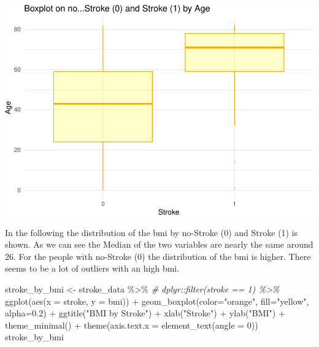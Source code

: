 \documentclass[
]{article}
\newenvironment{Shaded}{\begin{snugshade}}{\end{snugshade}}
\newcommand{\AttributeTok}[1]{\textcolor[rgb]{0.77,0.63,0.00}{#1}}
\newcommand{\CommentTok}[1]{\textcolor[rgb]{0.56,0.35,0.01}{\textit{#1}}}
\newcommand{\DecValTok}[1]{\textcolor[rgb]{0.00,0.00,0.81}{#1}}
\newcommand{\FloatTok}[1]{\textcolor[rgb]{0.00,0.00,0.81}{#1}}
\newcommand{\FunctionTok}[1]{\textcolor[rgb]{0.00,0.00,0.00}{#1}}
\newcommand{\NormalTok}[1]{#1}
\newcommand{\OtherTok}[1]{\textcolor[rgb]{0.56,0.35,0.01}{#1}}
\newcommand{\SpecialCharTok}[1]{\textcolor[rgb]{0.00,0.00,0.00}{#1}}
\newcommand{\StringTok}[1]{\textcolor[rgb]{0.31,0.60,0.02}{#1}}
\renewcommand{\=}[1]{\stackrel{#1}{=}}
\theoremstyle{definition}
\theoremstyle{remark}
\begin{document}
\includegraphics{sioux_mach_learn_project_files/figure-latex/unnamed-chunk-17-1.pdf}

In the following the distribution of the bmi by no-Stroke (0) and Stroke (1) is shown. As we can see the Median of the two variables are nearly the same around 26. For the people with no-Stroke (0) the distribution of the bmi is higher. There seems to be a lot of outliers with an high bmi.

\begin{Shaded}
\begin{Highlighting}[]
\NormalTok{stroke\_by\_bmi }\OtherTok{\textless{}{-}}\NormalTok{ stroke\_data }\SpecialCharTok{\%\textgreater{}\%}
\CommentTok{\# dplyr::filter(stroke == 1) \%\textgreater{}\%}
 \FunctionTok{ggplot}\NormalTok{(}\FunctionTok{aes}\NormalTok{(}\AttributeTok{x =}\NormalTok{ stroke,}
            \AttributeTok{y =}\NormalTok{ bmi)) }\SpecialCharTok{+}
  \FunctionTok{geom\_boxplot}\NormalTok{(}\AttributeTok{color=}\StringTok{"orange"}\NormalTok{, }\AttributeTok{fill=}\StringTok{"yellow"}\NormalTok{, }\AttributeTok{alpha=}\FloatTok{0.2}\NormalTok{) }\SpecialCharTok{+}
  \FunctionTok{ggtitle}\NormalTok{(}\StringTok{"BMI by Stroke"}\NormalTok{) }\SpecialCharTok{+} 
  \FunctionTok{xlab}\NormalTok{(}\StringTok{"Stroke"}\NormalTok{) }\SpecialCharTok{+} \FunctionTok{ylab}\NormalTok{(}\StringTok{"BMI"}\NormalTok{) }\SpecialCharTok{+}
  \FunctionTok{theme\_minimal}\NormalTok{() }\SpecialCharTok{+} \FunctionTok{theme}\NormalTok{(}\AttributeTok{axis.text.x =} \FunctionTok{element\_text}\NormalTok{(}\AttributeTok{angle =} \DecValTok{0}\NormalTok{))}
\NormalTok{stroke\_by\_bmi}
\end{Highlighting}
\end{Shaded}
\end{document}
